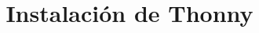 \documentclass[aspectratio=169]{beamer}
\title{Instalación de Thonny}
\begin{document}
\begin{frame}
    \titlepage
\end{frame}


\end{document}
